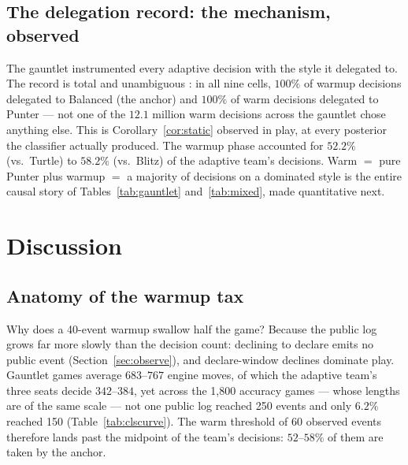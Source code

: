 \documentclass[11pt]{article}
\begin{document}
\subsection{The delegation record: the mechanism, observed}
\label{sec:usage}

The gauntlet instrumented every adaptive decision with the style it delegated to. The
record is total and unambiguous \cite{artifact}: in all nine cells, $100\%$ of warmup
decisions delegated to Balanced (the anchor) and $100\%$ of warm decisions delegated to
Punter --- not one of the $12.1$ million warm decisions across the gauntlet chose anything
else. This is Corollary~\ref{cor:static} observed in play, at every posterior the
classifier actually produced. The warmup phase accounted for $52.2\%$ (vs.\ Turtle) to
$58.2\%$ (vs.\ Blitz) of the adaptive team's decisions. Warm $=$ pure Punter plus warmup
$=$ a majority of decisions on a dominated style is the entire causal story of
Tables~\ref{tab:gauntlet} and~\ref{tab:mixed}, made quantitative next.

\section{Discussion}
\label{sec:discussion}

\subsection{Anatomy of the warmup tax}
\label{sec:warmupanatomy}

Why does a 40-event warmup swallow half the game? Because the public log grows far more
slowly than the decision count: declining to declare emits no public event
(Section~\ref{sec:observe}), and declare-window declines dominate play. Gauntlet games
average $683$--$767$ engine moves, of which the adaptive team's three seats decide
$342$--$384$, yet across the 1{,}800 accuracy games --- whose lengths are of the same
scale --- not one public log reached 250 events and only $6.2\%$ reached 150
(Table~\ref{tab:clscurve}). The warm threshold of 60 observed events therefore lands past
the midpoint of the team's decisions: $52$--$58\%$ of them are taken by the anchor.
\end{document}
